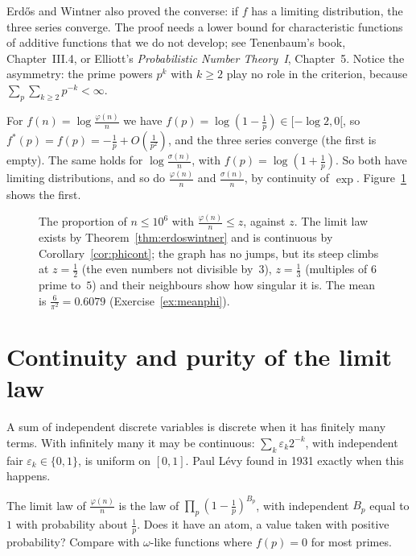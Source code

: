 \begin{remark}
Erd\H{o}s and Wintner also proved the converse: if $f$ has a limiting distribution, the three series converge. The proof needs a lower bound for characteristic functions of additive functions that we do not develop; see Tenenbaum's book, Chapter~III.4, or Elliott's \emph{Probabilistic Number Theory~I}, Chapter~5. Notice the asymmetry: the prime powers $p^k$ with $k\ge2$ play no role in the criterion, because $\sum_p\sum_{k\ge2}p^{-k}<\infty$.
\end{remark}

For $f(n)=\log\frac{\varphi(n)}n$ we have $f(p)=\log(1-\frac1p)\in[-\log2,0[$, so $f^*(p)=f(p)=-\frac1p+O(\frac1{p^2})$, and the three series converge (the first is empty). The same holds for $\log\frac{\sigma(n)}n$, with $f(p)=\log(1+\frac1p)$. So both have limiting distributions, and so do $\frac{\varphi(n)}n$ and $\frac{\sigma(n)}n$, by continuity of $\exp$. Figure~\ref{fig:phi} shows the first.

\begin{figure}[ht]
\centering{}
\caption{The proportion of $n\le10^6$ with $\frac{\varphi(n)}n\le z$, against $z$. The limit law exists by Theorem~\ref{thm:erdoswintner} and is continuous by Corollary~\ref{cor:phicont}; the graph has no jumps, but its steep climbs at $z=\frac12$ (the even numbers not divisible by~$3$), $z=\frac13$ (multiples of $6$ prime to~$5$) and their neighbours show how singular it is. The mean is $\frac6{\pi^2}=0.6079$ (Exercise~\ref{ex:meanphi}).}
\label{fig:phi}
\end{figure}

\section{Continuity and purity of the limit law}

A sum of independent discrete variables is discrete when it has finitely many terms. With infinitely many it may be continuous: $\sum_k\varepsilon_k2^{-k}$, with independent fair $\varepsilon_k\in\{0,1\}$, is uniform on $[0,1]$. Paul L\'evy found in 1931 exactly when this happens.

\begin{think}
The limit law of $\frac{\varphi(n)}n$ is the law of $\prod_p(1-\frac1p)^{B_p}$, with independent $B_p$ equal to $1$ with probability about $\frac1p$. Does it have an atom, a value taken with positive probability? Compare with $\omega$-like functions where $f(p)=0$ for most primes.
\end{think}

